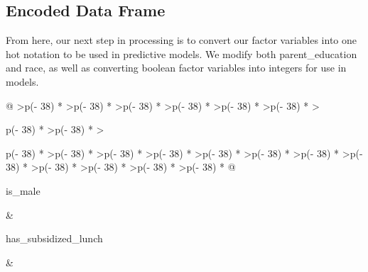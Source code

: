 \documentclass[
]{article}
\begin{document}
\subsection{Encoded Data Frame}\label{encoded-data-frame}

From here, our next step in processing is to convert our factor
variables into one hot notation to be used in predictive models. We
modify both parent\_education and race, as well as converting boolean
factor variables into integers for use in models.

\begin{longtable}[]{@{}
  >{\raggedleft\arraybackslash}p{(\columnwidth - 38\tabcolsep) * }
  >{\raggedleft\arraybackslash}p{(\columnwidth - 38\tabcolsep) * }
  >{\raggedleft\arraybackslash}p{(\columnwidth - 38\tabcolsep) * }
  >{\raggedleft\arraybackslash}p{(\columnwidth - 38\tabcolsep) * }
  >{\raggedleft\arraybackslash}p{(\columnwidth - 38\tabcolsep) * }
  >{\raggedleft\arraybackslash}p{(\columnwidth - 38\tabcolsep) * }
  >{\raggedright\arraybackslash}p{(\columnwidth - 38\tabcolsep) * }
  >{\raggedleft\arraybackslash}p{(\columnwidth - 38\tabcolsep) * }
  >{\raggedright\arraybackslash}p{(\columnwidth - 38\tabcolsep) * }
  >{\raggedleft\arraybackslash}p{(\columnwidth - 38\tabcolsep) * }
  >{\raggedleft\arraybackslash}p{(\columnwidth - 38\tabcolsep) * }
  >{\raggedleft\arraybackslash}p{(\columnwidth - 38\tabcolsep) * }
  >{\raggedleft\arraybackslash}p{(\columnwidth - 38\tabcolsep) * }
  >{\raggedleft\arraybackslash}p{(\columnwidth - 38\tabcolsep) * }
  >{\raggedleft\arraybackslash}p{(\columnwidth - 38\tabcolsep) * }
  >{\raggedleft\arraybackslash}p{(\columnwidth - 38\tabcolsep) * }
  >{\raggedleft\arraybackslash}p{(\columnwidth - 38\tabcolsep) * }
  >{\raggedleft\arraybackslash}p{(\columnwidth - 38\tabcolsep) * }
  >{\raggedleft\arraybackslash}p{(\columnwidth - 38\tabcolsep) * }
  >{\raggedleft\arraybackslash}p{(\columnwidth - 38\tabcolsep) * }@{}}
\toprule\noalign{}
\begin{minipage}[b]{\linewidth}\raggedleft
is\_male
\end{minipage} & \begin{minipage}[b]{\linewidth}\raggedleft
has\_subsidized\_lunch
\end{minipage} & \begin{minipage}[b]{\linewidth}\raggedleft

\end{minipage}
\end{longtable}
\end{document}
